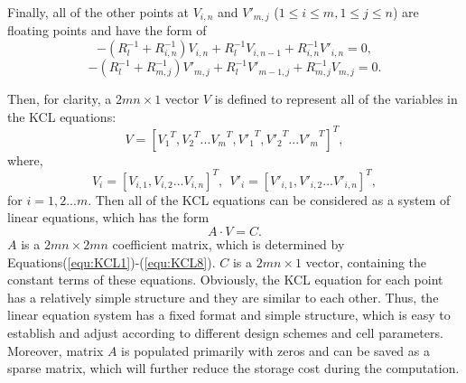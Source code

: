Finally, all of the other points at $V_{i,n}$ and $V'_{m,j}$ ($1\leq i\leq
m, 1\leq j\leq n$) are floating points and have the form of
\begin{equation}\label{equ:KCL7}
 -(R_l^{-1}+R_{i,n}^{-1})V_{i,n}+ R_l^{-1}V_{i,n-1}+R_{i,n}^{-1}V'_{i,n}=0,
\end{equation}
\begin{equation}\label{equ:KCL8}
 -(R_l^{-1}+R_{m,j}^{-1})V'_{m,j}+ R_l^{-1}V'_{m-1,j}+R_{m,j}^{-1}V_{m,j}=0.
\end{equation}

Then, for clarity, a ${2mn\times 1}$ vector ${V}$ is defined to represent
all of the variables in the KCL equations:
\begin{equation}\label{equ:V1}
{V}=[{V_1}^T,{V_2}^T...{V_m}^T,{V'_1}^T,{V'_2}^T...{V'_m}^T]^T,
\end{equation}
where,
\begin{equation}\label{equ:V2}
{V_i} = [V_{i,1},V_{i,2}...V_{i,n}]^T,~~{V'_i} = [V'_{i,1},V'_{i,2}...V'_{i,n}]^T,
\end{equation}
for $i=1,2...m$. Then all of the KCL equations can be considered as a
system of linear equations, which has the form
\begin{equation}\label{equ:matrix}
A\cdot V = C.
\end{equation}
$A$ is a ${2mn\times{2mn}}$ coefficient matrix, which is determined by
Equations(\ref{equ:KCL1})-(\ref{equ:KCL8}). $C$ is a ${2mn\times{1}}$
vector, containing the constant terms of these equations. Obviously, the
KCL equation for each point has a relatively simple structure and they are
similar to each other. Thus, the linear equation system has a fixed format
and simple structure, which is easy to establish and adjust according to
different design schemes and cell parameters. Moreover, matrix $A$ is
populated primarily with zeros and can be saved as a sparse matrix, which
will further reduce the storage cost during the computation.

